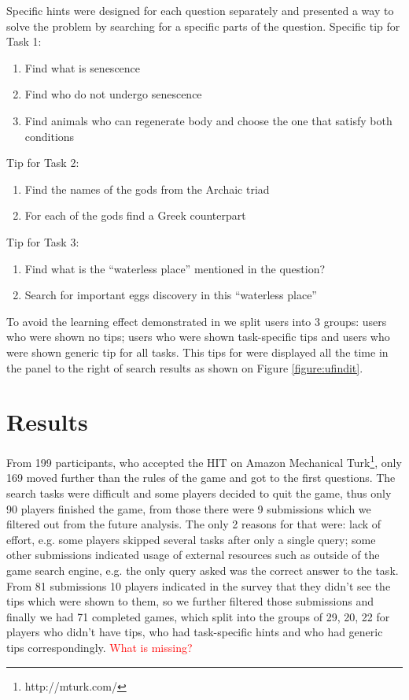 \documentclass{sig-alternate}
\newcommand\todo[1]{\textcolor{red}{#1}}
\begin{document}
Specific hints were designed for each question separately and presented a way to solve the problem by searching for a specific parts of the question.
Specific tip for Task 1:
\vspace{-1mm}
\begin{enumerate} \itemsep0pt \parskip0pt 
\item Find what is senescence
\item Find who do not undergo senescence
\item Find animals who can regenerate body and choose the one that satisfy both conditions
\end{enumerate}
\vspace{-1mm}
Tip for Task 2:
\vspace{-1mm}
\begin{enumerate} \itemsep0pt \parskip0pt 
\item Find the names of the gods from the Archaic triad
\item For each of the gods find a Greek counterpart
\end{enumerate}
\vspace{-1mm}
Tip for Task 3:
\vspace{-1mm}
\begin{enumerate} \itemsep0pt \parskip0pt 
\item Find what is the ``waterless place'' mentioned in the question?
\item Search for important eggs discovery in this ``waterless place''
\end{enumerate}

To avoid the learning effect demonstrated in \cite{Moraveji:2011:MIU:2009916.2009966} we split users into 3 groups: users who were shown no tips; users who were shown task-specific tips and users who were shown generic tip for all tasks. This tips for were displayed all the time in the panel to the right of search results as shown on Figure \ref{figure:ufindit}.


\section{Results}
From 199 participants, who accepted the HIT on Amazon Mechanical Turk\footnote{http://mturk.com/}, only 169 moved further than the rules of the game and got to the first questions.
The search tasks were difficult and some players decided to quit the game, thus only 90 players finished the game, from those there were 9 submissions which we filtered out from the future analysis.
The only 2 reasons for that were: lack of effort, e.g. some players skipped several tasks after only a single query; some other submissions indicated usage of external resources such as outside of the game search engine, e.g. the only query asked was the correct answer to the task.
From 81 submissions 10 players indicated in the survey that they didn't see the tips which were shown to them, so we further filtered those submissions and finally we had 71 completed games, which split into the groups of 29, 20, 22 for players who didn't have tips, who had task-specific hints and who had generic tips correspondingly.
\todo{What is missing?}
\end{document}
